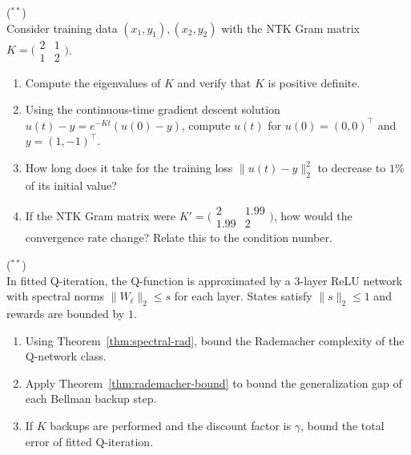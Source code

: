 \documentclass[11pt,a4paper]{article}
\begin{document}
\begin{exercise}
\textnormal{(\({}^{**}\))} \\
Consider training data $(x_1, y_1), (x_2, y_2)$ with the NTK Gram
matrix $K = \bigl( \begin{smallmatrix} 2 & 1 \\ 1 & 2
\end{smallmatrix} \bigr)$.
\begin{enumerate}[label=(\alph*)]
  \item Compute the eigenvalues of $K$ and verify that $K$ is
    positive definite.
  \item Using the continuous-time gradient descent solution
    $u(t) - y = e^{-Kt}(u(0) - y)$, compute $u(t)$ for
    $u(0) = (0, 0)^\top$ and $y = (1, -1)^\top$.
  \item How long does it take for the training loss
    $\|u(t) - y\|_2^2$ to decrease to $1\%$ of its initial value?
  \item If the NTK Gram matrix were $K' = \bigl(
    \begin{smallmatrix} 2 & 1.99 \\ 1.99 & 2 \end{smallmatrix}
    \bigr)$, how would the convergence rate change?  Relate this
    to the condition number.
\end{enumerate}
\end{exercise}

\begin{exercise}
\textnormal{(\({}^{**}\))} \\
In fitted Q-iteration, the Q-function is approximated by a $3$-layer
ReLU network with spectral norms $\|W_\ell\|_2 \le s$ for each layer.
States satisfy $\|s\|_2 \le 1$ and rewards are bounded by $1$.
\begin{enumerate}[label=(\alph*)]
  \item Using Theorem~\ref{thm:spectral-rad}, bound the Rademacher
    complexity of the Q-network class.
  \item Apply Theorem~\ref{thm:rademacher-bound} to bound the
    generalization gap of each Bellman backup step.
  \item If $K$ backups are performed and the discount factor is
    $\gamma$, bound the total error of fitted Q-iteration.
\end{enumerate}
\end{exercise}
\end{document}
